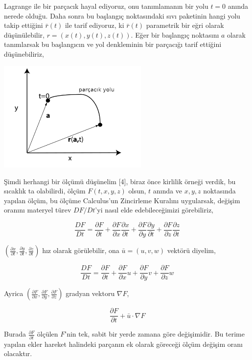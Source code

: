 \documentclass[12pt,fleqn]{article}\usepackage{../../common}
\begin{document}
Lagrange ile bir parçacık hayal ediyoruz, onu tanımlamanın bir yolu $t=0$ anında
nerede olduğu. Daha sonra bu başlangıç noktasındaki sıvı paketinin hangi yolu
takip ettiğini $\bar{r}(t)$ ile tarif ediyoruz, ki $\bar{r}(t)$ parametrik bir
eğri olarak düşünülebilir, $r = ( x(t), y(t), z(t) )$. Eğer bir başlangıç
noktasını $a$ olarak tanımlarsak bu başlangıcın ve yol denkleminin bir parçacığı
tarif ettiğini düşünebiliriz,

\includegraphics[width=20em]{phy_050_fluid_01.png}

Şimdi herhangi bir ölçümü düşünelim [4], biraz önce kirlilik örneği verdik, bu
sıcaklık ta olabilirdi, ölçüm $F(t,x,y,z)$ olsun, $t$ anında ve $x,y,z$
noktasında yapılan ölçüm, bu ölçüme Calculus'un Zincirleme Kuralını uygularsak,
değişim oranını materyel türev $D F / Dt$'yi nasıl elde edebileceğimizi
görebiliriz,

$$
\frac{D F}{D t} =
\frac{\partial F}{\partial t} +
\frac{\partial F}{\partial x} \frac{\partial x}{\partial t} + 
\frac{\partial F}{\partial y} \frac{\partial y}{\partial t} + 
\frac{\partial F}{\partial z} \frac{\partial z}{\partial t} 
$$

$(\frac{\partial x}{\partial t}, \frac{\partial y}{\partial t},\frac{\partial
z}{\partial t})$ hız olarak görülebilir, ona $\bar{u} = (u,v,w)$ vektörü diyelim,

$$
\frac{D F}{D t} =
\frac{\partial F}{\partial t} +
\frac{\partial F}{\partial x} u + 
\frac{\partial F}{\partial y} v + 
\frac{\partial F}{\partial z} w 
$$

Ayrica $(\frac{\partial F}{\partial x},\frac{\partial F}{\partial y},\frac{\partial F}{\partial z})$
gradyan vektoru $\nabla F$,

$$
\frac{\partial F}{\partial t} + \bar{u} \cdot \nabla F
$$

Burada $\frac{\partial F}{\partial t}$ ölçülen $F$'nin tek, sabit bir yerde
zamana göre değişimidir. Bu terime yapılan ekler hareket halindeki parçanın ek
olarak göreceği ölçüm değişim oranı olacaktır.
\end{document}

